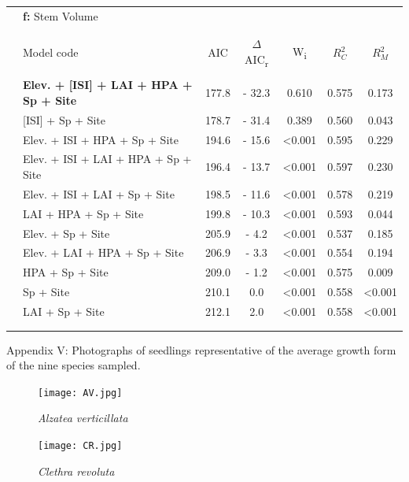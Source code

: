 \documentclass[a4paper,10pt,]{report}
\begin{document}
\begin{table}[H] \centering 
  \label{} 
\begin{tabular}{@{\extracolsep{5pt}} clSSSSS} 
& \textbf{\Large{f:}} Stem Volume &&&&&\\
\\[-1.8ex]\hline 
\hline \\[-1.8ex] 
 & Model code  & {AIC} & {$\Delta$AIC\textsubscript{r}} & {W\textsubscript{i}} & {$R_C^2$} & {$R_M^2$} \\ 
\hline \\[-1.8ex] 
 & \textbf{Elev. + [ISI] + LAI + HPA + Sp + Site} &  177.8  &   - 32.3  &  0.610  &  0.575  &  0.173  \\ 
 & [ISI] + Sp + Site &  178.7  &   - 31.4  &  0.389  &  0.560  &  0.043  \\ 
 & Elev. + ISI + HPA + Sp + Site &  194.6  &   - 15.6  &  <0.001  &  0.595  &  0.229  \\ 
 & Elev. + ISI + LAI + HPA + Sp + Site &  196.4  &   - 13.7  &  <0.001  &  0.597  &  0.230  \\ 
 & Elev. + ISI + LAI + Sp + Site &  198.5  &   - 11.6  &  <0.001  &  0.578  &  0.219  \\ 
 & LAI + HPA + Sp + Site &  199.8  &   - 10.3  &  <0.001  &  0.593  &  0.044  \\ 
 & Elev. + Sp + Site &  205.9  &   - 4.2  &  <0.001  &  0.537  &  0.185  \\ 
 & Elev. + LAI + HPA + Sp + Site &  206.9  &   - 3.3  &  <0.001  &  0.554  &  0.194  \\ 
 & HPA + Sp + Site &  209.0  &   - 1.2  &  <0.001  &  0.575  &  0.009  \\ 
 & Sp + Site &  210.1  &  0.0  &  <0.001  &  0.558  &  <0.001  \\ 
 & LAI + Sp + Site &  212.1  &  2.0  &  <0.001  &  0.558  &  <0.001  \\ 
\hline \\[-1.8ex] 
\hline\\

\end{tabular} 
\end{table}

\clearpage
Appendix V: Photographs of seedlings representative of the average growth form of the nine species sampled.
\begin{figure}[H]
\centering
\begin{minipage}{0.5\textwidth}
\centering
\texttt{[image: AV.jpg]}
\caption{\textit{Alzatea verticillata}}
\label{1}
\end{minipage}%
\begin{minipage}{0.5\textwidth}
\centering
\texttt{[image: CR.jpg]}
\caption{\textit{Clethra revoluta}}
\label{2}
\end{minipage}
\end{figure}
\end{document}
